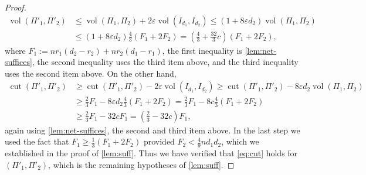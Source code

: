 \documentclass[aos]{imsart}
\theoremstyle{definition}
\numberwithin{equation}{section}
\DeclareMathOperator{\vol}{vol}
\DeclareMathOperator{\cut}{cut}
\newcommand{\eps}{\varepsilon}
\begin{document}
\begin{appendix}
\begin{proof}
\begin{align*}
  \vol(\Pi'_1,\Pi'_2)
&\leq \vol(\Pi_1,\Pi_2) + 2 \eps \vol(I_{d_1}, I_{d_2})
\leq (1 + 8 \eps d_2) \vol(\Pi_1,\Pi_2) \\
&\leq (1 + 8 \eps d_2) \frac43 \left( F_1 + 2 F_2 \right)
= \left( \frac43 + \frac{32}3 c \right) \left( F_1 + 2 F_2 \right),
\end{align*}
where $F_1 := n r_1(d_2 - r_2) + n r_2(d_1-r_1)$, the first inequality is \cref{lem:net-suffices}, the second inequality uses the third item above, and the third inequality uses the second item above.
On the other hand,
\begin{align*}
  \cut(\Pi'_1,\Pi'_2)
&\geq \cut(\Pi'_1,\Pi'_2) - 2 \eps \vol(I_{d_1}, I_{d_2})
\geq \cut(\Pi'_1,\Pi'_2) - 8 \eps d_2 \vol(\Pi_1,\Pi_2) \\
&\geq \frac23 F_1 - 8 \eps d_2 \frac43 (F_1 + 2 F_2)
= \frac23 F_1 - 8 c \frac43 (F_1 + 2 F_2) \\
&\geq \frac23 F_1 - 32 c F_1
= \left( \frac23 - 32 c \right) F_1,
\end{align*}
again using \cref{lem:net-suffices}, the second and third item above.
In the last step we used the fact that $F_1 \geq \frac{1}{3} (F_1 + 2 F_2)$ provided $F_2 < \frac49 n d_1 d_2$, which we established in the proof of \cref{lem:suff}.
Thus we have verified that \cref{eq:cut} holds for $(\Pi'_1,\Pi'_2)$, which is the remaining hypotheses of \cref{lem:suff}.


\end{proof}
\end{appendix}
\end{document}
